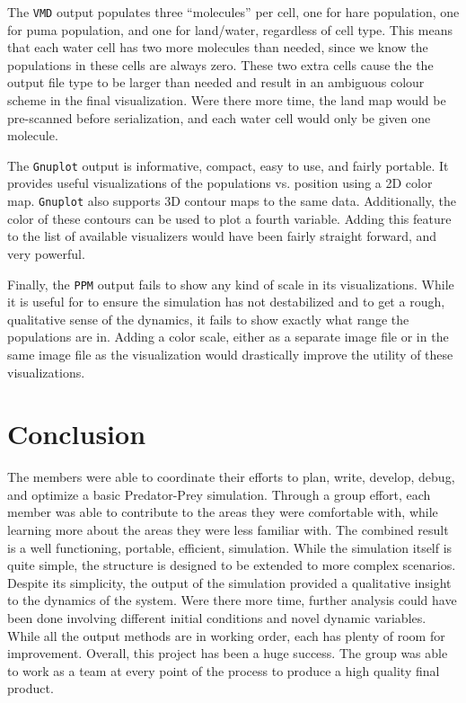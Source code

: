 \documentclass[a4paper,11pt]{article}
\begin{document}
The \texttt{VMD} output populates three ``molecules'' per cell, one for hare population, one for puma population, and one for land/water, regardless of cell type.  This means that each water cell has two more molecules than needed, since we know the populations in these cells are always zero.  These two extra cells cause the the output file type to be larger than needed and result in an ambiguous colour scheme in the final visualization.  Were there more time, the land map would be pre-scanned before serialization, and each water cell would only be given one molecule.

The \texttt{Gnuplot} output is informative, compact, easy to use, and fairly portable.  It provides useful visualizations of the populations vs. position using a 2D color map.   \texttt{Gnuplot} also supports 3D contour maps to the same data.  Additionally, the color of these contours can be used to plot a fourth variable.  Adding this feature to the list of available visualizers would have been fairly straight forward, and very powerful.  

Finally, the \texttt{PPM} output fails to show any kind of scale in its visualizations.  While it is useful for to ensure the simulation has not destabilized and to get a rough, qualitative sense of the dynamics, it fails to show exactly what range the populations are in.  Adding a color scale, either as a separate image file or in the same image file as the visualization would drastically improve the utility of these visualizations.
 
 \section{Conclusion}

The members were able to coordinate their efforts to plan, write, develop, debug, and optimize a basic Predator-Prey simulation.  Through a group effort, each member was able to contribute to the areas they were comfortable with, while learning more about the areas they were less familiar with.   The combined result is a well functioning, portable, efficient,   simulation.  While the simulation itself is quite simple, the structure is designed to be extended to more complex scenarios.  Despite its simplicity, the output of the simulation provided a qualitative insight to the dynamics of the system.  Were there more time, further analysis could have been done involving different initial conditions and novel dynamic variables.  While all the output methods are in working order, each has plenty of room for improvement.  Overall, this project has been a huge success.  The group was able to work as a team at every point of the process to produce a high quality final product. 
\end{document}

